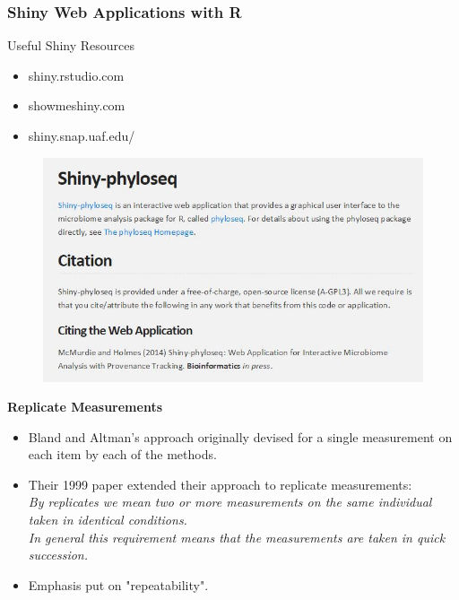 \documentclass[compress]{beamer}        %
\makeatletter
\newcommand{\tcb}{\textcolor{beamer@blendedblue}}
\makeatother
\begin{document}
\begin{frame}
\frametitle{Shiny Web Applications with R}
\Large
Useful Shiny Resources

\begin{itemize}
\item  shiny.rstudio.com \bigskip
\item  showmeshiny.com \bigskip
\item  shiny.snap.uaf.edu/ \bigskip
\end{itemize}
\end{frame}

\begin{frame}
	\begin{figure}
		\centering
		\includegraphics[width=0.99\linewidth]{SHINYCITE}
	\end{figure}
	
\end{frame}

\begin{frame}{\bf \tcb{Replicate Measurements}}
\begin{itemize}\itemsep0.7cm
\item Bland and Altman's approach originally devised for a single measurement on each item by each of the methods.
\item Their 1999 paper \cite{BA99} extended their approach to replicate measurements:\\ \emph{By replicates we mean two or more measurements on the same
individual taken in identical conditions. \\In general this requirement means that the
measurements are taken in quick succession. }
\item Emphasis put on "repeatability".
\end{itemize}
\end{frame}
\end{document}
